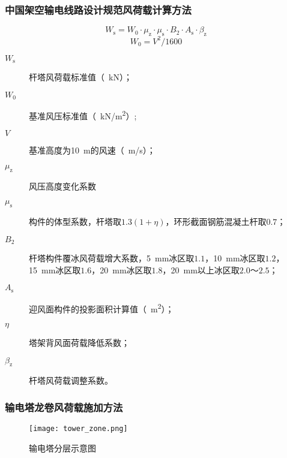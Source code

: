 \begin{frame}
  \frametitle{中国架空输电线路设计规范风荷载计算方法}
  \begin{equation}
    W_{\mathrm{s}} = W_{0} \cdot \mu_{\mathrm{z}} \cdot \mu_{\mathrm{s}} \cdot B_{2} \cdot A_{\mathrm{s}} \cdot \beta_{\mathrm{z}}
  \end{equation}
  \begin{equation}
    W_0 = V^2/1600
  \end{equation}
  \begin{description}
	\item[$W_{\mathrm{s}}$] 杆塔风荷载标准值（\SI{}{kN}）；
	\item[$W_{0}$] 基准风压标准值（\SI{}{kN/m^2}）;
	\item[$V$] 基准高度为\SI{10}{m}的风速（\SI{}{m/s}）；
	\item[$\mu_{\mathrm{z}}$] 风压高度变化系数
	\item[$\mu_{\mathrm{s}}$] 构件的体型系数，杆塔取$1.3(1+\eta)$，环形截面钢筋混凝土杆取$0.7$；
	\item[$B_{2}$] 杆塔构件覆冰风荷载增大系数，\SI{5}{mm}冰区取$1.1$，\SI{10}{mm}冰区取$1.2$，\SI{15}{mm}冰区取$1.6$，\SI{20}{mm}冰区取$1.8$，\SI{20}{mm}以上冰区取$2.0$～$2.5$；
	\item[$A_\mathrm{s}$] 迎风面构件的投影面积计算值（\SI{}{m^2}）；
	\item[$\eta$] 塔架背风面荷载降低系数；
	\item[$\beta_\mathrm{z}$] 杆塔风荷载调整系数。
  \end{description}
\end{frame}

\begin{frame}
  \frametitle{输电塔龙卷风荷载施加方法}
  \begin{figure}[!htbp]
    \centering
    \texttt{[image: tower\_zone.png]}
    \caption*{输电塔分层示意图}\label{fig:tower-zone}
  \end{figure}
 
\end{frame}

